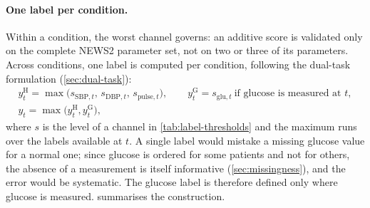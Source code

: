 \paragraph{One label per condition.} Within a condition, the worst channel governs: an additive score is validated only on the complete NEWS2 parameter set, not on two or three of its parameters. Across conditions, one label is computed per condition, following the dual-task formulation (\cref{sec:dual-task}):
\begin{gather}
  y^{\mathrm{H}}_t = \max\bigl(s_{\mathrm{SBP},t},\, s_{\mathrm{DBP},t},\, s_{\mathrm{pulse},t}\bigr),
  \qquad
  y^{\mathrm{G}}_t = s_{\mathrm{glu},t} \ \text{if glucose is measured at } t, \\
  y_t = \max\bigl(y^{\mathrm{H}}_t, y^{\mathrm{G}}_t\bigr),
\end{gather}
where $s$ is the level of a channel in \cref{tab:label-thresholds} and the maximum runs over the labels available at $t$. A single label would mistake a missing glucose value for a normal one; since glucose is ordered for some patients and not for others, the absence of a measurement is itself informative (\cref{sec:missingness}), and the error would be systematic. The glucose label is therefore defined only where glucose is measured.  summarises the construction.

